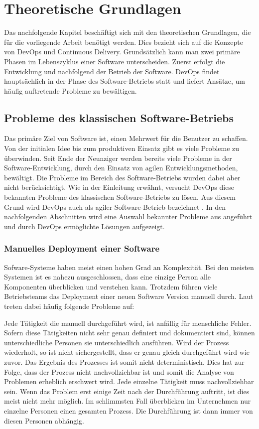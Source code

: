 \chapter{Theoretische Grundlagen}
Das nachfolgende Kapitel beschäftigt sich mit den theoretischen Grundlagen, die für die vorliegende Arbeit benötigt werden. Dies bezieht sich auf die Konzepte von DevOps und Continuous Delivery. Grundsätzlich kann man zwei primäre Phasen im Lebenszyklus einer Software unterscheiden. Zuerst erfolgt die Entwicklung und nachfolgend der Betrieb der Software. DevOps findet hauptsächlich in der Phase des Software-Betriebs statt und liefert Ansätze, um häufig auftretende Probleme zu bewältigen.

\section{Probleme des klassischen Software-Betriebs}
\label{sec:probleme}
Das primäre Ziel von Software ist, einen Mehrwert für die Benutzer zu schaffen. Von der initialen Idee bis zum produktiven Einsatz gibt es viele Probleme zu überwinden. Seit Ende der Neunziger werden bereits viele Probleme in der Software-Entwicklung, durch den Einsatz von agilen Entwicklungsmethoden, bewältigt. Die Probleme im Bereich des Software-Betriebs wurden dabei aber nicht berücksichtigt. Wie in der Einleitung erwähnt, versucht DevOps diese bekannten Probleme des klassischen Software-Betriebs zu lösen. Aus diesem Grund wird DevOps auch als agiler Software-Betrieb bezeichnet \cite{humble2010, peschlow2012}. In den nachfolgenden Abschnitten wird eine Auswahl bekannter Probleme aus \cite{humble2010} angeführt und durch DevOps ermöglichte Lösungen aufgezeigt.

\subsection{Manuelles Deployment einer Software}
\label{sec:problem:manuellesdeployment}
Sofware-Systeme haben meist einen hohen Grad an Komplexität. Bei den meisten Systemen ist es nahezu ausgeschlossen, dass eine einzige Person alle Komponenten überblicken und verstehen kann. Trotzdem führen viele Betriebsteams das Deployment einer neuen Software Version manuell durch. Laut \cite{humble2010} treten dabei häufig folgende Probleme auf:

Jede Tätigkeit die manuell durchgeführt wird, ist anfällig für menschliche Fehler. Sofern diese Tätigkeiten nicht sehr genau definiert und dokumentiert sind, können unterschiedliche Personen sie unterschiedlich ausführen. Wird der Prozess wiederholt, so ist nicht sichergestellt, dass er genau gleich durchgeführt wird wie zuvor. Das Ergebnis des Prozesses ist somit nicht deterministisch. Dies hat zur Folge, dass der Prozess nicht nachvollziehbar ist und somit die Analyse von Problemen erheblich erschwert wird. Jede einzelne Tätigkeit muss nachvollziehbar sein. Wenn das Problem erst einige Zeit nach der Durchführung auftritt, ist dies meist nicht mehr möglich. Im schlimmsten Fall überblicken im Unternehmen nur einzelne Personen einen gesamten Prozess. Die Durchführung ist dann immer von diesen Personen abhängig.

